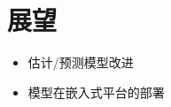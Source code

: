 \documentclass{beamer}
\begin{document}




\section{展望}

\begin{frame}
	\begin{itemize}
		\item 估计/预测模型改进
		\item 模型在嵌入式平台的部署
	\end{itemize}
\end{frame}


% 
% 

\end{document}
